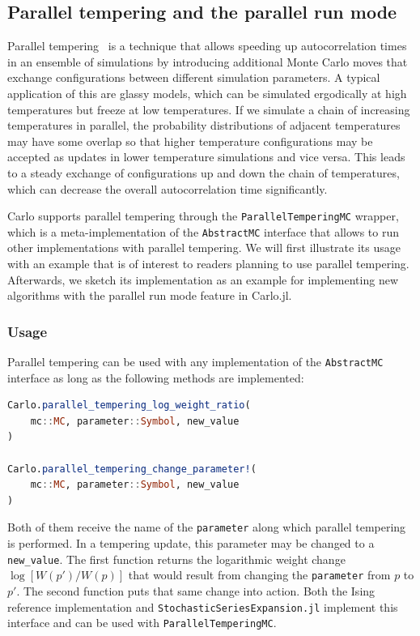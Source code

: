 \documentclass{SciPost}
\begin{document}
\subsection{Parallel tempering and the parallel run mode}
\label{sec:parallel_tempering}
Parallel tempering~\cite{Earl2005} is a technique that allows speeding up autocorrelation times in an ensemble of simulations by introducing additional Monte Carlo moves that exchange configurations between different simulation parameters. A typical application of this are glassy models, which can be simulated ergodically at high temperatures but freeze at low temperatures. If we simulate a chain of increasing temperatures in parallel, the probability distributions of adjacent temperatures may have some overlap so that higher temperature configurations may be accepted as updates in lower temperature simulations and vice versa. This leads to a steady exchange of configurations up and down the chain of temperatures, which can decrease the overall autocorrelation time significantly.

Carlo supports parallel tempering through the \texttt{ParallelTemperingMC} wrapper, which is a meta-implementation of the \texttt{AbstractMC} interface that allows to run other implementations with parallel tempering. We will first illustrate its usage with an example that is of interest to readers planning to use parallel tempering. Afterwards, we sketch its implementation as an example for implementing new algorithms with the parallel run mode feature in Carlo.jl.
\subsubsection{Usage}
Parallel tempering can be used with any implementation of the \texttt{AbstractMC} interface as long as the following methods are implemented:
\begin{lstlisting}[language=julia]
Carlo.parallel_tempering_log_weight_ratio(
    mc::MC, parameter::Symbol, new_value
)

Carlo.parallel_tempering_change_parameter!(
    mc::MC, parameter::Symbol, new_value
)
\end{lstlisting}
Both of them receive the name of the \texttt{parameter} along which parallel tempering is performed. In a tempering update, this parameter may be changed to a \texttt{new\_{}value}. The first function returns the logarithmic weight change $\log[W(p')/W(p)]$ that would result from changing the \texttt{parameter} from $p$ to $p'$. The second function puts that same change into action. Both the Ising reference implementation and \texttt{StochasticSeriesExpansion.jl} implement this interface and can be used with \texttt{ParallelTemperingMC}.
\end{document}
